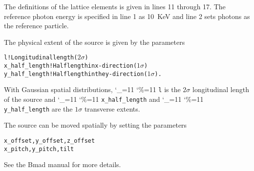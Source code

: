\documentclass[11pt]{article}
\newcommand\ttcmd{\begingroup\catcode`\_=11 \catcode`\%=11 \dottcmd}
\newcommand\dottcmd[1]{\texttt{#1}\endgroup}
\newcommand{\vn}{\ttcmd}
\newenvironment{example}
  {\vspace{\ExBeg} \begin{alltt}}
  {\end{alltt} \vspace{\ExEnd}}
\newlength{\ExBeg}
\newlength{\ExEnd}
\begin{document}
The definitions of the lattice elements is given in lines 11 through
17.  The reference photon energy is specified in line 1 as 10~KeV and
line 2 sets photons as the reference particle.

The physical extent of the source is given by the parameters
\begin{example}
  l              ! Longitudinal length (\(2 \sigma\))
  x_half_length  ! Half length in x-direction (\(1 \sigma\))
  y_half_length  ! Half length in the y-direction (\(1 \sigma\)).
\end{example}
With Gaussian spatial distributions, \vn{l} is the $2\sigma$
longitudinal length of the source and \vn{x_half_length} and
\vn{y_half_length} are the $1\sigma$ transverse extents.

The source can be moved spatially by setting the parameters
\begin{example}
  x_offset, y_offset, z_offset
  x_pitch, y_pitch, tilt
\end{example}
See the Bmad manual for more details.
\end{document}
